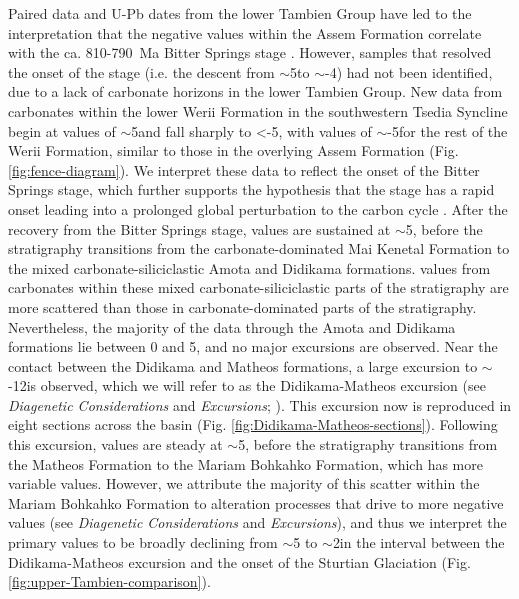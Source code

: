 Paired \dC data and U-Pb dates from the lower Tambien Group have led to the interpretation that the negative \dC values within the Assem Formation correlate with the ca. 810-790~Ma Bitter Springs stage \citep{Swanson-Hysell2015a}. However, samples that resolved the onset of the stage (i.e. the descent from $\sim$5\permil to $\sim$-4\permil) had not been identified, due to a lack of carbonate horizons in the lower Tambien Group. New \dC data from carbonates within the lower Werii Formation in the southwestern Tsedia Syncline begin at values of $\sim$5\permil and fall sharply to \textless-5\permil, with values of $\sim$-5\permil for the rest of the Werii Formation, similar to those in the overlying Assem Formation (Fig. \ref{fig:fence-diagram}). We interpret these \dC data to reflect the onset of the Bitter Springs stage, which further supports the hypothesis that the stage has a rapid onset leading into a prolonged global perturbation to the carbon cycle \citep{Maloof2006a, Swanson-Hysell2015a}. After the recovery from the Bitter Springs stage, \dC values are sustained at $\sim$5\permil, before the stratigraphy transitions from the carbonate-dominated Mai Kenetal Formation to the mixed carbonate-siliciclastic Amota and Didikama formations. \dC values from carbonates within these mixed carbonate-siliciclastic parts of the stratigraphy are more scattered than those in carbonate-dominated parts of the stratigraphy. Nevertheless, the majority of the data through the Amota and Didikama formations lie between 0 and 5\permil, and no major excursions are observed. Near the contact between the Didikama and Matheos formations, a large \dC excursion to $\sim$-12\permil is observed, which we will refer to as the Didikama-Matheos excursion (see \textit{Diagenetic Considerations} and \textit{\dC Excursions}; \citealp{Swanson-Hysell2015a, MacLennan2018a}). This \dC excursion now is reproduced in eight sections across the basin (Fig. \ref{fig:Didikama-Matheos-sections}). Following this excursion, \dC values are steady at $\sim$5\permil, before the stratigraphy transitions from the Matheos Formation to the Mariam Bohkahko Formation, which has more variable \dC values. However, we attribute the majority of this scatter within the Mariam Bohkahko Formation to alteration processes that drive \dC to more negative values (see \textit{Diagenetic Considerations} and \textit{\dC Excursions}), and thus we interpret the primary \dC values to be broadly declining from $\sim$5 to $\sim$2\permil in the interval between the Didikama-Matheos excursion and the onset of the Sturtian Glaciation (Fig. \ref{fig:upper-Tambien-comparison}).

